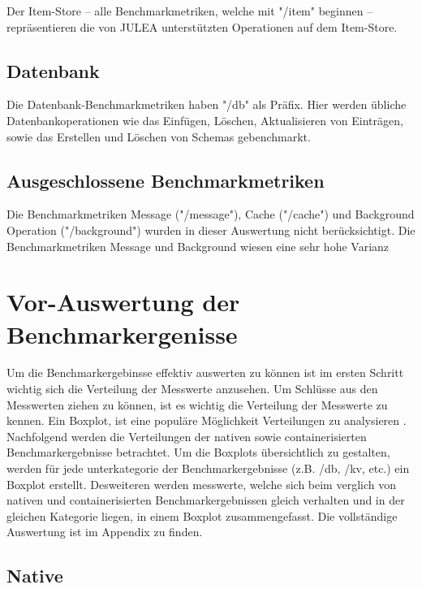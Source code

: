 Der Item-Store – alle Benchmarkmetriken, welche mit "/item" beginnen – repräsentieren die von JULEA unterstützten Operationen auf dem Item-Store.

\subsection{Datenbank}

Die Datenbank-Benchmarkmetriken haben "/db" als Präfix. Hier werden übliche Datenbankoperationen wie das Einfügen, Löschen, Aktualisieren von Einträgen, sowie das Erstellen und Löschen von Schemas gebenchmarkt.

\subsection{Ausgeschlossene Benchmarkmetriken}

Die Benchmarkmetriken Message ("/message"), Cache ("/cache") und Background Operation ("/background") wurden in dieser Auswertung nicht berücksichtigt. Die Benchmarkmetriken Message und Background wiesen eine sehr hohe Varianz 


\section{Vor-Auswertung der Benchmarkergenisse}

Um die Benchmarkergebinsse effektiv auswerten zu können ist im ersten Schritt wichtig sich die Verteilung der Messwerte anzusehen. Um Schlüsse aus den Messwerten ziehen zu können, ist es wichtig die Verteilung der Messwerte zu kennen. Ein Boxplot, ist eine populäre Möglichkeit Verteilungen zu analysieren \cite[Vgl. 1]{majawExploringDataDistributions2023}. Nachfolgend werden die Verteilungen der nativen sowie containerisierten Benchmarkergebnisse betrachtet. Um die Boxplots übersichtlich zu gestalten, werden für jede unterkategorie der Benchmarkergebnisse (z.B. /db, /kv, etc.) ein Boxplot erstellt. Desweiteren werden messwerte, welche sich beim verglich von nativen und containerisierten Benchmarkergebnissen gleich verhalten und in der gleichen Kategorie liegen, in einem Boxplot zusammengefasst. Die vollständige Auswertung ist im Appendix zu finden. 

\subsection{Native}

